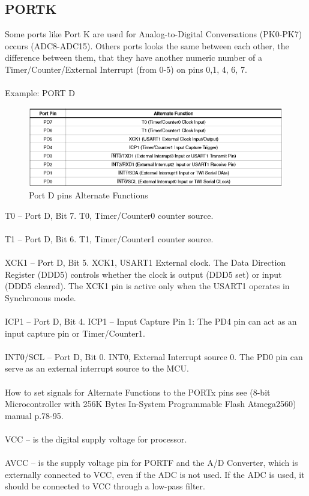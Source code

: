 \documentclass[english]{article}
\begin{document}
\subsection{PORTK}
Some ports like Port K are used for Analog-to-Digital Conversations (PK0-PK7) occurs (ADC8-ADC15). Others ports looks the same between each other, the difference between them, that they have another numeric number of a Timer/Counter/External Interrupt (from 0-5) on pins 0,1, 4, 6, 7.\\\\
Example: PORT D
\begin{figure}[H]
\caption{Port D pins Alternate Functions}
\centerline{\includegraphics[scale=0.8]{MicroLab1/pictures/5}}
\end{figure}
T0 – Port D, Bit 7. T0, Timer/Counter0 counter source.\\\\
T1 – Port D, Bit 6. T1, Timer/Counter1 counter source.\\\\
XCK1 – Port D, Bit 5. XCK1, USART1 External clock. The Data Direction Register (DDD5) controls whether the clock is output (DDD5 set) or input (DDD5 cleared). The XCK1 pin is active only when the USART1 operates in Synchronous mode.\\\\
ICP1 – Port D, Bit 4. ICP1 – Input Capture Pin 1: The PD4 pin can act as an input capture pin or Timer/Counter1.\\\\
INT0/SCL – Port D, Bit 0. INT0, External Interrupt source 0. The PD0 pin can serve as an external interrupt source to the MCU.\\\\
How to set signals for Alternate Functions to the PORTx pins see (8-bit Microcontroller with 256K Bytes In-System Programmable Flash Atmega2560) manual p.78-95.\\\\
VCC – is the digital supply voltage for processor.\\\\
AVCC – is the supply voltage pin for PORTF and the A/D Converter, which is externally connected to VCC, even if the ADC is not used. If the ADC is used, it should be connected to VCC through a low-pass filter.\\\\
\end{document}
